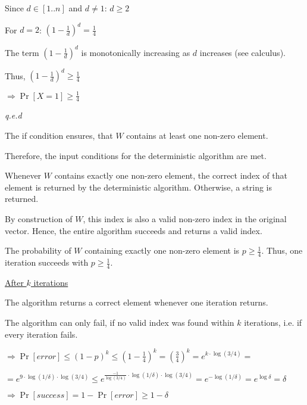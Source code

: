 \begin{itemize}
    Since $d \in [1..n]$ and $d \neq 1$: $d \geq 2$ 

    For $d = 2$: $\left(1 - \frac{1}{d}\right)^{d} = \frac{1}{4}$
        
    The term $\left(1 - \frac{1}{d}\right)^{d}$ is monotonically increasing as $d$ increases (see calculus).  
    
    Thus, $\left(1 - \frac{1}{d}\right)^{d} \geq \frac{1}{4}$
    
    $\Rightarrow \Pr[X = 1] \geq \frac{1}{4}$
    
    \textit{q.e.d}
    
    The if condition ensures, that $W$ contains at least one non-zero element.
    
    Therefore, the input conditions for the deterministic algorithm are met. 
    
    Whenever $W$ contains exactly one non-zero element, the correct index of that element is returned by the deterministic algorithm. Otherwise, a string is returned.
    
    By construction of $W$, this index is also a valid non-zero index in the original vector. Hence, the entire algorithm succeeds and returns a valid index.
    
    The probability of $W$ containing exactly one non-zero element is $p \geq \frac{1}{4}$. Thus, one iteration succeeds with $p \geq \frac{1}{4}$.
    
    \underline{After $k$ iterations}
    
    The algorithm returns a correct element whenever one iteration returns.
    
    The algorithm can only fail, if no valid index was found within $k$ iterations, i.e. if every iteration fails.
    
    $\Rightarrow \Pr[\textit{error}] \leq 
    (1 - p)^k \leq 
    \left(1 - \frac{1}{4}\right)^k = 
    \left(\frac{3}{4}\right)^k = 
    e^{k \cdot \log(3/4)} = $
    
    $ = e^{9 \cdot \log(1/\delta) \cdot \log(3/4)} \leq
    e^{\frac{- 1}{\log(3/4)} \cdot \log(1/\delta) \cdot \log(3/4)} = 
    e^{-\log(1/\delta)} = 
    e^{\log \delta} =
    \delta$
    
    $\Rightarrow \Pr[\textit{success}] = 1 - \Pr[\textit{error}] \geq 1 - \delta$
    
\end{itemize}

